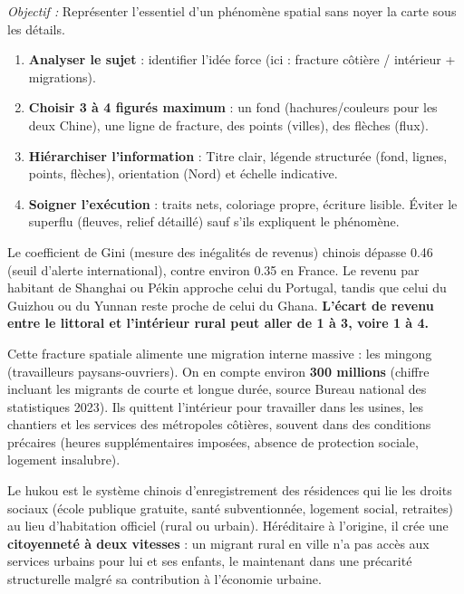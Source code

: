 \documentclass[11pt]{article}
\newcommand{\cle}[1]{{\popxbold\color{popdark}#1}}
\begin{document}
\begin{methode}
\emph{Objectif :} Représenter l'essentiel d'un phénomène spatial sans noyer la carte sous les détails.
\begin{enumerate}
\item \textbf{Analyser le sujet} : identifier l'idée force (ici : fracture côtière / intérieur + migrations).
\item \textbf{Choisir 3 à 4 figurés maximum} : un fond (hachures/couleurs pour les deux Chine), une ligne de fracture, des points (villes), des flèches (flux).
\item \textbf{Hiérarchiser l'information} : Titre clair, légende structurée (fond, lignes, points, flèches), orientation (Nord) et échelle indicative.
\item \textbf{Soigner l'exécution} : traits nets, coloriage propre, écriture lisible. Éviter le superflu (fleuves, relief détaillé) sauf s'ils expliquent le phénomène.
\end{enumerate}
\end{methode}

\begin{exemplebox}
Le coefficient de Gini (mesure des inégalités de revenus) chinois dépasse \num{0,46} (seuil d'alerte international), contre environ \num{0,35} en France. Le revenu par habitant de Shanghai ou Pékin approche celui du Portugal, tandis que celui du Guizhou ou du Yunnan reste proche de celui du Ghana. \textbf{L'écart de revenu entre le littoral et l'intérieur rural peut aller de 1 à 3, voire 1 à 4.}
\end{exemplebox}

Cette fracture spatiale alimente une migration interne massive : les \cle{mingong} (travailleurs paysans-ouvriers). On en compte environ \textbf{300 millions} (chiffre incluant les migrants de courte et longue durée, source Bureau national des statistiques 2023). Ils quittent l'intérieur pour travailler dans les usines, les chantiers et les services des métropoles côtières, souvent dans des conditions précaires (heures supplémentaires imposées, absence de protection sociale, logement insalubre).

\begin{definition}
Le \cle{hukou} est le système chinois d'enregistrement des résidences qui lie les droits sociaux (école publique gratuite, santé subventionnée, logement social, retraites) au lieu d'habitation officiel (rural ou urbain). Héréditaire à l'origine, il crée une \textbf{citoyenneté à deux vitesses} : un migrant rural en ville n'a pas accès aux services urbains pour lui et ses enfants, le maintenant dans une précarité structurelle malgré sa contribution à l'économie urbaine.
\end{definition}
\end{document}
